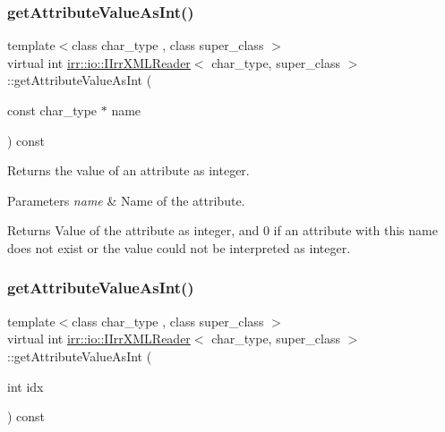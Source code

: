 \subsubsection{\texorpdfstring{get\+Attribute\+Value\+As\+Int()}{getAttributeValueAsInt()}\hspace{0.1cm}{\footnotesize\ttfamily [1/2]}}
{\footnotesize\ttfamily template$<$class char\+\_\+type , class super\+\_\+class $>$ \\
virtual int \hyperlink{classirr_1_1io_1_1IIrrXMLReader}{irr\+::io\+::\+I\+Irr\+X\+M\+L\+Reader}$<$ char\+\_\+type, super\+\_\+class $>$\+::get\+Attribute\+Value\+As\+Int (\begin{DoxyParamCaption}\item[{const char\+\_\+type $\ast$}]{name }\end{DoxyParamCaption}) const\hspace{0.3cm}{\ttfamily [pure virtual]}}



Returns the value of an attribute as integer. 


\begin{DoxyParams}{Parameters}
{\em name} & Name of the attribute. \\
\hline
\end{DoxyParams}
\begin{DoxyReturn}{Returns}
Value of the attribute as integer, and 0 if an attribute with this name does not exist or the value could not be interpreted as integer. 
\end{DoxyReturn}
\mbox{\label{classirr_1_1io_1_1IIrrXMLReader_a8f2d57c9f358b9683fb177f440661426}} 
\subsubsection{\texorpdfstring{get\+Attribute\+Value\+As\+Int()}{getAttributeValueAsInt()}\hspace{0.1cm}{\footnotesize\ttfamily [2/2]}}
{\footnotesize\ttfamily template$<$class char\+\_\+type , class super\+\_\+class $>$ \\
virtual int \hyperlink{classirr_1_1io_1_1IIrrXMLReader}{irr\+::io\+::\+I\+Irr\+X\+M\+L\+Reader}$<$ char\+\_\+type, super\+\_\+class $>$\+::get\+Attribute\+Value\+As\+Int (\begin{DoxyParamCaption}\item[{int}]{idx }\end{DoxyParamCaption}) const\hspace{0.3cm}{\ttfamily [pure virtual]}}



